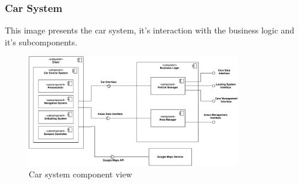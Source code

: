 \subsubsection{Car System}

This image presents the car system, it's interaction with the business logic and
it's subcomponents.

\begin{figure}[H]
	\includegraphics[width=350px]{../Datas/images/CarComponentView.pdf}
	\caption{Car system component view}
	\label{fig:CarSystemComponentView}
\end{figure}

